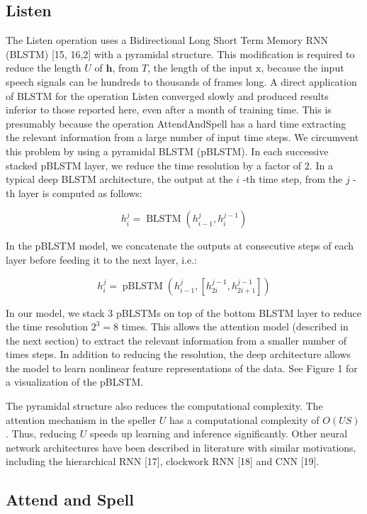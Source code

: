
\subsection{Listen}

The Listen operation uses a Bidirectional Long Short Term Memory RNN (BLSTM) [15, 16,2] with a pyramidal structure. This modification is required to reduce the length $U$ of $\mathbf{h}$, from $T$, the length of the input $\mathrm{x}$, because the input speech signals can be hundreds to thousands of frames long. A direct application of BLSTM for the operation Listen converged slowly and produced results inferior to those reported here, even after a month of training time. This is presumably because the operation AttendAndSpell has a hard time extracting the relevant information from a large number of input time steps. We circumvent this problem by using a pyramidal BLSTM (pBLSTM). In each successive stacked pBLSTM layer, we reduce the time resolution by a factor of $2 .$ In a typical deep BLSTM architecture, the output at the $i$ -th time step, from the $j$ -th layer is computed as follows:

$$
h_{i}^{j}=\operatorname{BLSTM}\left(h_{i-1}^{j}, h_{i}^{j-1}\right)
$$

In the pBLSTM model, we concatenate the outputs at consecutive steps of each layer before feeding it to the next layer, i.e.:

$$
h_{i}^{j}=\operatorname{pBLSTM}\left(h_{i-1}^{j},\left[h_{2 i}^{j-1}, h_{2 i+1}^{j-1}\right]\right)
$$

In our model, we stack 3 pBLSTMs on top of the bottom BLSTM layer to reduce the time resolution $2^{3}=8$ times. This allows the attention model (described in the next section) to extract the relevant information from a smaller number of times steps. In addition to reducing the resolution, the deep architecture allows the model to learn nonlinear feature representations of the data. See Figure 1 for a visualization of the pBLSTM.

The pyramidal structure also reduces the computational complexity. The attention mechanism in the speller $U$ has a computational complexity of $O(U S)$. Thus, reducing $U$ speeds up learning and inference significantly. Other neural network architectures have been described in literature with similar motivations, including the hierarchical RNN [17], clockwork RNN [18] and CNN [19].

\subsection{Attend and Spell}

